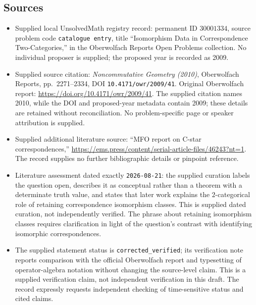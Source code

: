 \documentclass[11pt]{article}
\begin{document}
\subsection{Sources}
\begin{itemize}
\item Supplied local UnsolvedMath registry record: permanent ID \(30001334\), source problem code \texttt{catalogue entry}, title ``Isomorphism Data in Correspondence Two-Categories,'' in the Oberwolfach Reports Open Problems collection. No individual proposer is supplied; the proposed year is recorded as 2009.
\item Supplied source citation: \emph{Noncommutative Geometry (2010)}, Oberwolfach Reports, pp.\ 2271--2334, DOI \texttt{10.4171/owr/2009/41}. Original Oberwolfach report: \url{https://doi.org/10.4171/owr/2009/41}. The supplied citation names 2010, while the DOI and proposed-year metadata contain 2009; these details are retained without reconciliation. No problem-specific page or speaker attribution is supplied.
\item Supplied additional literature source: ``MFO report on C-star correspondences,'' \url{https://ems.press/content/serial-article-files/46243?nt=1}. The record supplies no further bibliographic details or pinpoint reference.
\item Literature assessment dated exactly \texttt{2026-08-21}: the supplied curation labels the question open, describes it as conceptual rather than a theorem with a determinate truth value, and states that later work explains the \(2\)-categorical role of retaining correspondence isomorphism classes. This is supplied dated curation, not independently verified. The phrase about retaining isomorphism classes requires clarification in light of the question's contrast with identifying isomorphic correspondences.
\item The supplied statement status is \texttt{corrected\_verified}; its verification note reports comparison with the official Oberwolfach report and typesetting of operator-algebra notation without changing the source-level claim. This is a supplied verification claim, not independent verification in this draft. The record expressly requests independent checking of time-sensitive status and cited claims.
\end{itemize}
\end{document}
